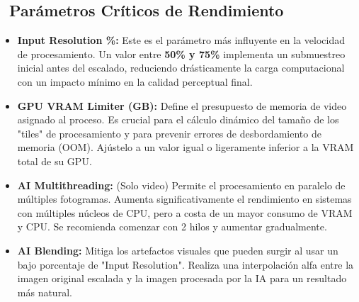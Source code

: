 \documentclass[11pt, a4paper]{article}
\begin{document}
\subsection{\faSlidersH\ Parámetros Críticos de Rendimiento}
\begin{itemize}[leftmargin=*, itemsep=2pt]
    \item \textbf{Input Resolution \%:} Este es el parámetro más influyente en la velocidad de procesamiento. Un valor entre \textbf{50\% y 75\%} implementa un submuestreo inicial antes del escalado, reduciendo drásticamente la carga computacional con un impacto mínimo en la calidad perceptual final.
    \item \textbf{GPU VRAM Limiter (GB):} Define el presupuesto de memoria de video asignado al proceso. Es crucial para el cálculo dinámico del tamaño de los "tiles" de procesamiento y para prevenir errores de desbordamiento de memoria (OOM). Ajústelo a un valor igual o ligeramente inferior a la VRAM total de su GPU.
    \item \textbf{AI Multithreading:} (Solo video) Permite el procesamiento en paralelo de múltiples fotogramas. Aumenta significativamente el rendimiento en sistemas con múltiples núcleos de CPU, pero a costa de un mayor consumo de VRAM y CPU. Se recomienda comenzar con 2 hilos y aumentar gradualmente.
    \item \textbf{AI Blending:} Mitiga los artefactos visuales que pueden surgir al usar un bajo porcentaje de "Input Resolution". Realiza una interpolación alfa entre la imagen original escalada y la imagen procesada por la IA para un resultado más natural.
\end{itemize}
\end{document}

